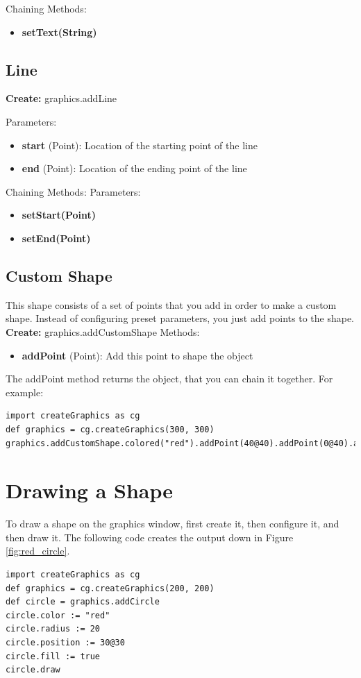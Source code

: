 \documentclass{article}
\begin{document}
Chaining Methods:
\begin{itemize}
\item \textbf{setText(String)} 
\end{itemize}

\subsection{Line}
\textbf{Create:} graphics.addLine

Parameters:
\begin{itemize}
\item \textbf{start} (Point): Location of the starting point of the line
\item \textbf{end} (Point): Location of the ending point of the line
\end{itemize}

Chaining Methods:
Parameters:
\begin{itemize}
\item \textbf{setStart(Point)} 
\item \textbf{setEnd(Point)}
\end{itemize}

\subsection{Custom Shape}
This shape consists of a set of points that you add in order to make a custom shape.
Instead of configuring preset parameters, you just add points to the shape. 
\textbf{Create:} graphics.addCustomShape
Methods:
\begin{itemize}
\item \textbf{addPoint} (Point): Add this point to shape the object
\end{itemize}

The addPoint method returns the object, that you can chain it together. For example:
\begin{lstlisting}
import createGraphics as cg
def graphics = cg.createGraphics(300, 300)
graphics.addCustomShape.colored("red").addPoint(40@40).addPoint(0@40).addPoint(40@0).draw
\end{lstlisting}

\section{Drawing a Shape}
To draw a shape on the graphics window, first create it, then configure it, and then draw it. The following code
creates the output down in Figure \ref{fig:red_circle}.
\begin{lstlisting}
import createGraphics as cg
def graphics = cg.createGraphics(200, 200)
def circle = graphics.addCircle
circle.color := "red"
circle.radius := 20
circle.position := 30@30
circle.fill := true
circle.draw
\end{lstlisting}
\end{document}
